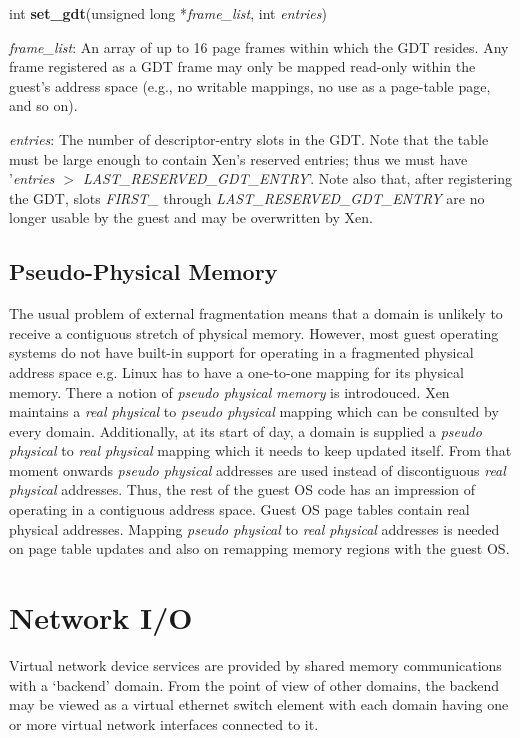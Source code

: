 \documentclass[11pt,twoside,final,openright]{xenstyle}
\begin{document}
int {\bf set\_gdt}(unsigned long *{\em frame\_list}, int {\em entries})

{\em frame\_list}: An array of up to 16 page frames within which the
GDT resides.  Any frame registered as a GDT frame may only be mapped
read-only within the guest's address space (e.g., no writable
mappings, no use as a page-table page, and so on).

{\em entries}: The number of descriptor-entry slots in the GDT.  Note
that the table must be large enough to contain Xen's reserved entries;
thus we must have '{\em entries $>$ LAST\_RESERVED\_GDT\_ENTRY}'.
Note also that, after registering the GDT, slots {\em FIRST\_} through
{\em LAST\_RESERVED\_GDT\_ENTRY} are no longer usable by the guest and
may be overwritten by Xen.

\section{Pseudo-Physical Memory}
The usual problem of external fragmentation means that a domain is
unlikely to receive a contiguous stretch of physical memory.  However,
most guest operating systems do not have built-in support for
operating in a fragmented physical address space e.g. Linux has to
have a one-to-one mapping for its physical memory.  There a notion of
{\it pseudo physical memory} is introdouced.  Xen maintains a {\it
real physical} to {\it pseudo physical} mapping which can be consulted
by every domain.  Additionally, at its start of day, a domain is
supplied a {\it pseudo physical} to {\it real physical} mapping which
it needs to keep updated itself.  From that moment onwards {\it pseudo
physical} addresses are used instead of discontiguous {\it real
physical} addresses.  Thus, the rest of the guest OS code has an
impression of operating in a contiguous address space.  Guest OS page
tables contain real physical addresses.  Mapping {\it pseudo physical}
to {\it real physical} addresses is needed on page table updates and
also on remapping memory regions with the guest OS.



\chapter{Network I/O}

Virtual network device services are provided by shared memory
communications with a `backend' domain.  From the point of view of
other domains, the backend may be viewed as a virtual ethernet switch
element with each domain having one or more virtual network interfaces
connected to it.
\end{document}
